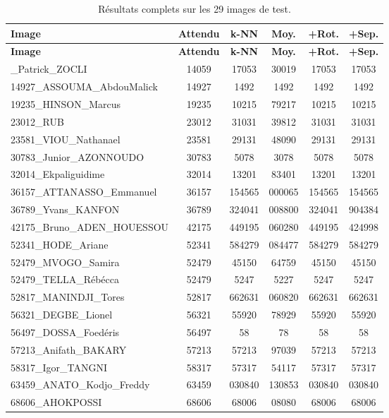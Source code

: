 \documentclass[a4paper,11pt]{article}
\begin{document}
\begin{longtable}{l|c|c|c|c|c}
\caption{Résultats complets sur les 29 images de test.} \label{tab:complet} \\
\toprule
\textbf{Image} & \textbf{Attendu} & \textbf{k-NN} & \textbf{Moy.} & \textbf{+Rot.} & \textbf{+Sep.} \\
\midrule
\endfirsthead
\toprule
\textbf{Image} & \textbf{Attendu} & \textbf{k-NN} & \textbf{Moy.} & \textbf{+Rot.} & \textbf{+Sep.} \\
\midrule
\endhead
\bottomrule
\endfoot
14059\_Patrick\_ZOCLI & 14059 & 17053 & 30019 & 17053 & 17053 \\
14927\_ASSOUMA\_AbdouMalick & 14927 & 1492 & 1492 & 1492 & 1492 \\
19235\_HINSON\_Marcus & 19235 & 10215 & 79217 & 10215 & 10215 \\
23012\_RUB & 23012 & 31031 & 39812 & 31031 & 31031 \\
23581\_VIOU\_Nathanael & 23581 & 29131 & 48090 & 29131 & 29131 \\
30783\_Junior\_AZONNOUDO & 30783 & 5078 & 3078 & 5078 & 5078 \\
32014\_Ekpaliguidime & 32014 & 13201 & 83401 & 13201 & 13201 \\
36157\_ATTANASSO\_Emmanuel & 36157 & 154565 & 000065 & 154565 & 154565 \\
36789\_Yvans\_KANFON & 36789 & 324041 & 008800 & 324041 & 904384 \\
42175\_Bruno\_ADEN\_HOUESSOU & 42175 & 449195 & 060280 & 449195 & 424998 \\
52341\_HODE\_Ariane & 52341 & 584279 & 084477 & 584279 & 584279 \\
52479\_MVOGO\_Samira & 52479 & 45150 & 64759 & 45150 & 45150 \\
52479\_TELLA\_Rébécca & 52479 & 5247 & 5227 & 5247 & 5247 \\
52817\_MANINDJI\_Tores & 52817 & 662631 & 060820 & 662631 & 662631 \\
56321\_DEGBE\_Lionel & 56321 & 55920 & 78929 & 55920 & 55920 \\
56497\_DOSSA\_Foedéris & 56497 & 58 & 78 & 58 & 58 \\
57213\_Anifath\_BAKARY & 57213 & 57213 & 97039 & 57213 & 57213 \\
58317\_Igor\_TANGNI & 58317 & 57317 & 54117 & 57317 & 57317 \\
63459\_ANATO\_Kodjo\_Freddy & 63459 & 030840 & 130853 & 030840 & 030840 \\
68606\_AHOKPOSSI & 68606 & 68006 & 08080 & 68006 & 68006 \\

\end{longtable}
\end{document}
